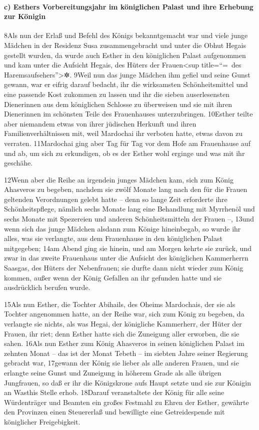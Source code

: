 \hypertarget{c-esthers-vorbereitungsjahr-im-kuxf6niglichen-palast-und-ihre-erhebung-zur-kuxf6nigin}{%
\paragraph{c) Esthers Vorbereitungsjahr im königlichen Palast und ihre
Erhebung zur
Königin}\label{c-esthers-vorbereitungsjahr-im-kuxf6niglichen-palast-und-ihre-erhebung-zur-kuxf6nigin}}

8Als nun der Erlaß und Befehl des Königs bekanntgemacht war und viele
junge Mädchen in der Residenz Susa zusammengebracht und unter die Obhut
Hegais gestellt wurden, da wurde auch Esther in den königlichen Palast
aufgenommen und kam unter die Aufsicht Hegais, des Hüters der
Frauen\textless sup title=``=~des Haremsaufsehers''\textgreater✲. 9Weil
nun das junge Mädchen ihm gefiel und seine Gunst gewann, war er eifrig
darauf bedacht, ihr die wirksamsten Schönheitsmittel und eine passende
Kost zukommen zu lassen und ihr die sieben auserlesensten Dienerinnen
aus dem königlichen Schlosse zu überweisen und sie mit ihren Dienerinnen
im schönsten Teile des Frauenhauses unterzubringen. 10Esther teilte aber
niemandem etwas von ihrer jüdischen Herkunft und ihren
Familienverhältnissen mit, weil Mardochai ihr verboten hatte, etwas
davon zu verraten. 11Mardochai ging aber Tag für Tag vor dem Hofe am
Frauenhause auf und ab, um sich zu erkundigen, ob es der Esther wohl
erginge und was mit ihr geschähe.

12Wenn aber die Reihe an irgendein junges Mädchen kam, sich zum König
Ahasveros zu begeben, nachdem sie zwölf Monate lang nach den für die
Frauen geltenden Verordnungen gelebt hatte -- denn so lange Zeit
erforderte ihre Schönheitspflege, nämlich sechs Monate lang eine
Behandlung mit Myrrhenöl und sechs Monate mit Spezereien und anderen
Schönheitsmitteln der Frauen --, 13und wenn sich das junge Mädchen
alsdann zum Könige hineinbegab, so wurde ihr alles, was sie verlangte,
aus dem Frauenhause in den königlichen Palast mitgegeben; 14am Abend
ging sie hinein, und am Morgen kehrte sie zurück, und zwar in das zweite
Frauenhaus unter die Aufsicht des königlichen Kammerherrn Saasgas, des
Hüters der Nebenfrauen; sie durfte dann nicht wieder zum König kommen,
außer wenn der König Gefallen an ihr gefunden hatte und sie ausdrücklich
berufen wurde.

15Als nun Esther, die Tochter Abihails, des Oheims Mardochais, der sie
als Tochter angenommen hatte, an der Reihe war, sich zum König zu
begeben, da verlangte sie nichts, als was Hegai, der königliche
Kammerherr, der Hüter der Frauen, ihr riet; denn Esther hatte sich die
Zuneigung aller erworben, die sie sahen. 16Als nun Esther zum König
Ahasveros in seinen königlichen Palast im zehnten Monat -- das ist der
Monat Tebeth -- im siebten Jahre seiner Regierung gebracht war, 17gewann
der König sie lieber als alle anderen Frauen, und sie erlangte seine
Gunst und Zuneigung in höherem Grade als alle übrigen Jungfrauen, so daß
er ihr die Königskrone aufs Haupt setzte und sie zur Königin an Wasthis
Stelle erhob. 18Darauf veranstaltete der König für alle seine
Würdenträger und Beamten ein großes Festmahl zu Ehren der Esther,
gewährte den Provinzen einen Steuererlaß und bewilligte eine
Getreidespende mit königlicher Freigebigkeit.

